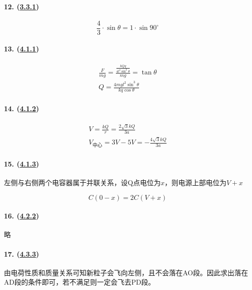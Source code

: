 \paragraph{12. (\hyperref[subsec:3.3.1]{3.3.1})}

\begin{equation*}
    \frac43\cdot\sin\theta=1\cdot\sin90^\circ
\end{equation*}

\paragraph{13. (\hyperref[subsec:4.1.1]{4.1.1})}

\begin{gather*}
    \frac{F}{mg}=\frac{\frac{kQq}{4l^2\sin^2\theta}}{mg}=\tan\theta\\
    Q=\frac{4mgl^2\sin^3\theta}{kq\cos\theta}
\end{gather*}

\paragraph{14. (\hyperref[subsec:4.1.2]{4.1.2})}

\begin{gather*}
    V=\frac{kQ}{r}=\frac{2\sqrt{3}kQ}{3a}\\
    V_\textrm{中心}=3V-5V=-\frac{4\sqrt{3}kQ}{3a}
\end{gather*}

\paragraph{15. (\hyperref[subsec:4.1.3]{4.1.3})} 左侧与右侧两个电容器属于并联关系，设Q点电位为$x$，则电源上部电位为$V+x$

\begin{equation*}
    C(0-x)=2C(V+x)
\end{equation*}

\paragraph{16. (\hyperref[subsec:4.2.2]{4.2.2})} 略
\paragraph{17. (\hyperref[subsec:4.3.3]{4.3.3})} 由电荷性质和质量关系可知新粒子会飞向左侧，且不会落在AO段。因此求出落在AD段的条件即可，若不满足则一定会飞去PD段。

